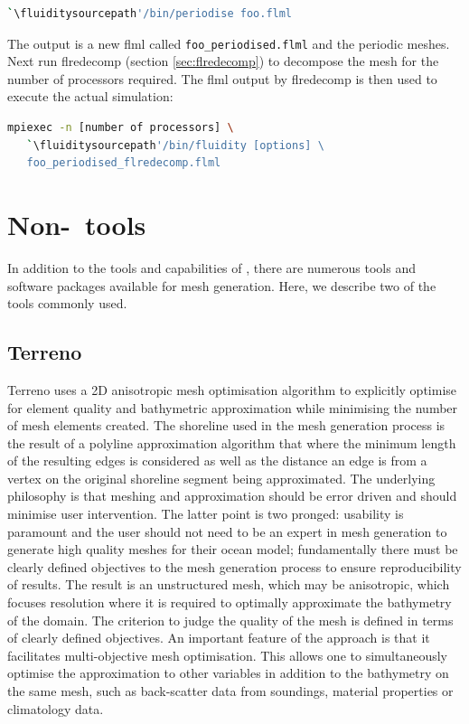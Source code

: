 \begin{lstlisting}[language=bash]
`\fluiditysourcepath'/bin/periodise foo.flml
\end{lstlisting}

The output is a new flml called \lstinline+foo_periodised.flml+ and the
periodic meshes. Next run flredecomp (section \ref{sec:flredecomp}) to decompose the mesh for the number of processors
required. The flml output by flredecomp is then used to execute the actual simulation:

\begin{lstlisting}[language=bash]
mpiexec -n [number of processors] \
   `\fluiditysourcepath'/bin/fluidity [options] \
   foo_periodised_flredecomp.flml
\end{lstlisting}

\section{Non-\fluidity\ tools}

In addition to the tools and capabilities of \fluidity, there are numerous
tools and software packages available for mesh generation. Here, we describe 
two of the tools commonly used.

\subsection{Terreno}
\label{sec:Terreno}

Terreno uses a 2D anisotropic mesh optimisation algorithm to explicitly optimise for 
element quality and bathymetric approximation while minimising the number of mesh
elements created. The shoreline used in the mesh generation process is the result 
of a polyline approximation algorithm that where the minimum length of the resulting 
edges is considered as well as the distance an edge is from a vertex on the original 
shoreline segment being approximated. The underlying philosophy is that meshing and 
approximation should be error driven and should minimise user intervention. The 
latter point is two pronged: usability is paramount and the user should not need 
to be an expert in mesh generation to generate high quality meshes for their ocean 
model; fundamentally there must be clearly defined objectives to the mesh generation 
process to ensure reproducibility of results. The result is an unstructured mesh, 
which may be anisotropic, which focuses resolution where it is required to optimally 
approximate the bathymetry of the domain. The criterion to judge the quality of the 
mesh is defined in terms of clearly defined objectives. An important feature of the 
approach is that it facilitates multi-objective mesh optimisation. This allows one to 
simultaneously optimise the approximation to other variables in addition to the 
bathymetry on the same mesh, such as back-scatter data from soundings, material 
properties or climatology data. 

